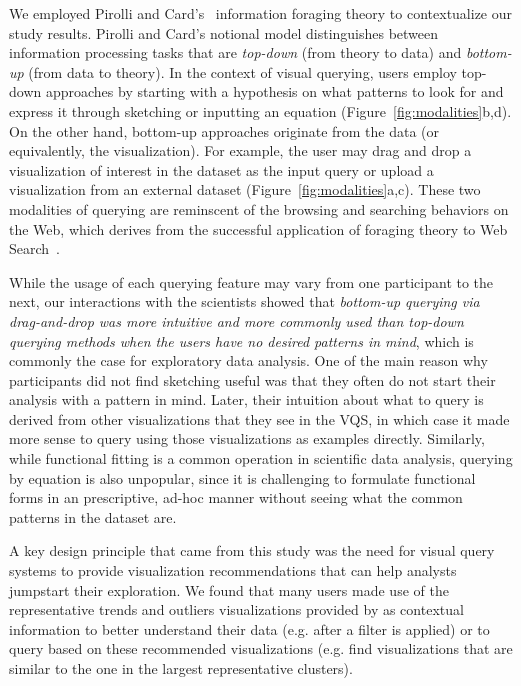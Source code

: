 \par We employed Pirolli and Card's~\cite{Pirolli} information foraging theory to contextualize our study results. Pirolli and Card's notional model distinguishes between information processing tasks that are \textit{top-down} (from theory to data) and \textit{bottom-up} (from data to theory). In the context of visual querying, users employ top-down approaches by starting with a hypothesis on what patterns to look for and express it through sketching or inputting an equation (Figure~\ref{fig:modalities}b,d). On the other hand, bottom-up approaches originate from the data (or equivalently, the visualization). For example, the user may drag and drop a visualization of interest in the dataset as the input query or upload a visualization from an external dataset (Figure~\ref{fig:modalities}a,c). These two modalities of querying are reminscent of the browsing and searching behaviors on the Web, which derives from the successful application of foraging theory to Web Search~\cite{Olston2003}.
\par While the usage of each querying feature may vary from one participant to the next, our interactions with the scientists showed that \emph{bottom-up querying via drag-and-drop was more intuitive and more commonly used than top-down querying methods when the users have no desired patterns in mind}, which is commonly the case for exploratory data analysis. One of the main reason why participants did not find sketching useful was that they often do not start their analysis with a pattern in mind. Later, their intuition about what to query is derived from other visualizations that they see in the VQS, in which case it made more sense to query using those visualizations as examples directly. Similarly, while functional fitting is a common operation in scientific data analysis, querying by equation is also unpopular, since it is challenging to formulate functional forms in an prescriptive, ad-hoc manner without seeing what the common patterns in the dataset are. 
\par A key design principle that came from this study was the need for visual query systems to provide visualization recommendations that can help analysts jumpstart their exploration. We found that many users made use of the representative trends and outliers visualizations provided by \zv as contextual information to better understand their data (e.g. after a filter is applied) or to query based on these recommended visualizations (e.g. find visualizations that are similar to the one in the largest representative clusters). 
